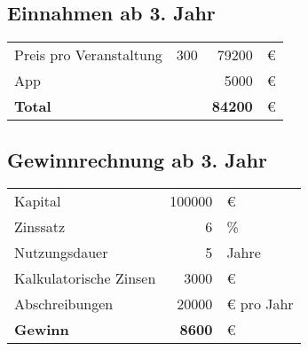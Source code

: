 %
%

\subsection{Einnahmen ab 3. Jahr}

\begin{table}[H]

    \begin{tabular}{l r r l}
        Preis pro Veranstaltung & 300       & 79200 & €\\
        App                     &           & 5000  & €\\
        \midrule
        \textbf{Total}          &           & \textbf{84200}  & €
    \end{tabular}
    \label{tab:einnahmen}
\end{table}


\subsection{Gewinnrechnung ab 3. Jahr}

\begin{table}[H]
    \begin{tabular}{l r l}
        Kapital                 & 100000    & €\\
        Zinssatz                & 6         & \%\\
        Nutzungsdauer           & 5         & Jahre\\
        \midrule
        Kalkulatorische Zinsen & 3000 & €\\
        Abschreibungen & 20000 & € pro Jahr\\
        \midrule
        \textbf{Gewinn}         & \textbf{8600}  & €
    \end{tabular}
    \label{tab:bla}
\end{table}


